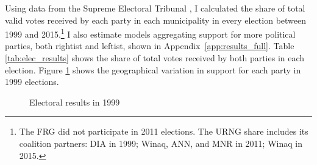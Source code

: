 \documentclass[12pt, notitlepage]{article}
\begin{document}
Using data from the Supreme Electoral Tribunal \citep{TSE:2019aa}, I calculated the share of total valid votes received by each party in each municipality in every election between 1999 and 2015.\footnote{The FRG did not participate in 2011 elections. The URNG share includes its coalition partners: DIA in 1999; Winaq, ANN, and MNR in 2011; Winaq in 2015.}
I also estimate models aggregating support for more political parties, both rightist and leftist, shown in Appendix~\ref{app:results_full}.
Table \ref{tab:elec_results} shows the share of total votes received by both parties in each election.
Figure \ref{fig:map_elec1999} shows the geographical variation in support for each party in 1999 elections.

\begin{figure}[!ht]
    \centering

    \begin{minipage}{1\textwidth}
      \centering
      \hspace{25pt}
    \end{minipage}

    \caption{Electoral results in 1999}\label{fig:map_elec1999}

\end{figure}
\end{document}
